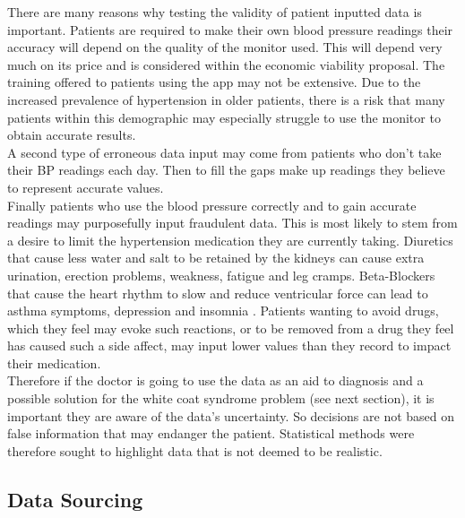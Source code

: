 \documentclass[11pt]{article}
\begin{document}
There are many reasons why testing the validity of patient inputted data is important. Patients are required to make their own blood pressure readings their accuracy will depend on the quality of the monitor used. This will depend very much on its price and is considered within the economic viability proposal. The training offered to patients using the app may not be extensive. Due to the increased prevalence of hypertension in older patients, there is a risk that many patients within this demographic may especially struggle to use the monitor to obtain accurate results. 
\\ \indent
A second type of erroneous data input may come from patients who don't take their BP readings each day. Then to fill the gaps make up readings they believe to represent accurate values.
\\ \indent
Finally patients who use the blood pressure correctly and to gain accurate readings may purposefully input fraudulent data. This is most likely to stem from a desire to limit the hypertension medication they are currently taking. Diuretics that cause less water and salt to be retained by the kidneys can cause extra urination, erection problems, weakness, fatigue and leg cramps. Beta-Blockers that cause the heart rhythm to slow and reduce ventricular force can lead to asthma symptoms, depression and insomnia \cite{webmd1}. Patients wanting to avoid drugs, which they feel may evoke such reactions, or to be removed from a drug they feel has caused such a side affect, may input lower values than they record to impact their medication.
\\ \indent
Therefore if the doctor is going to use the data as an aid to diagnosis and a possible solution for the white coat syndrome problem (see next section), it is important they are aware of the data's uncertainty. So decisions are not based on false information that may endanger the patient. Statistical methods were therefore sought to highlight data that is not deemed to be realistic. 

\subsection{Data Sourcing}
\end{document}
